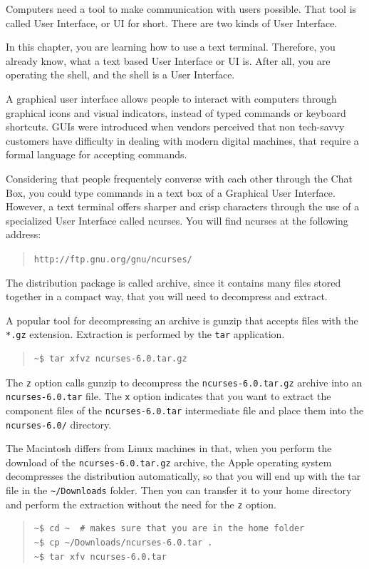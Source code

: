 \documentclass[a4paper,12pt]{book}
\begin{document}
Computers need a tool to make communication
with users possible. That tool is
called User Interface, or UI for short.
There are two kinds of User Interface.

In this chapter, you are learning how to use a
text terminal. Therefore, you already know,
what a text based User Interface or UI is.
After all, you are operating the shell,
and the shell is a User Interface.

A graphical user interface
allows people to interact with
computers through graphical icons and
visual indicators, instead of 
typed commands or keyboard shortcuts.
GUIs were introduced when vendors
perceived that non tech-savvy customers have
difficulty in dealing with modern
digital machines, that require a formal
language for accepting commands.

Considering that people frequentely
converse with each other through
the Chat Box, you could type commands
in a text box of a Graphical User
Interface. However, a text terminal
offers sharper and crisp characters
through the use of a specialized
User Interface called ncurses.
You will find ncurses at
the following address:
\begin{quote}
\verb|http://ftp.gnu.org/gnu/ncurses/|
\end{quote}
The distribution package is called
archive, since it contains many
files stored together in a compact way,
that you will need to decompress
and extract.

A popular tool for decompressing an archive
is gunzip that accepts files with the \verb|*.gz|
extension. Extraction is performed by the \verb|tar|
application. 
\begin{quote}
\begin{verbatim}
~$ tar xfvz ncurses-6.0.tar.gz
\end{verbatim}
\end{quote}
The \verb|z| option calls gunzip to
decompress the
\verb|ncurses-6.0.tar.gz| archive into
an \verb|ncurses-6.0.tar| file. The
\verb|x| option indicates that
you want to extract the component
files of the \verb|ncurses-6.0.tar| intermediate
file and place them into the \verb|ncurses-6.0/|
directory.

The Macintosh differs from Linux machines
in that, when you perform the download of the
\verb|ncurses-6.0.tar.gz| archive, the
Apple operating system decompresses the distribution
automatically, so that you will end up
with the tar file in the \verb|~/Downloads|
folder. Then you can transfer it to your home directory
and perform the extraction without the need for the
\verb|z| option.
\begin{quote}
\begin{verbatim}
~$ cd ~  # makes sure that you are in the home folder
~$ cp ~/Downloads/ncurses-6.0.tar .
~$ tar xfv ncurses-6.0.tar
\end{verbatim}
\end{quote}
\end{document}
